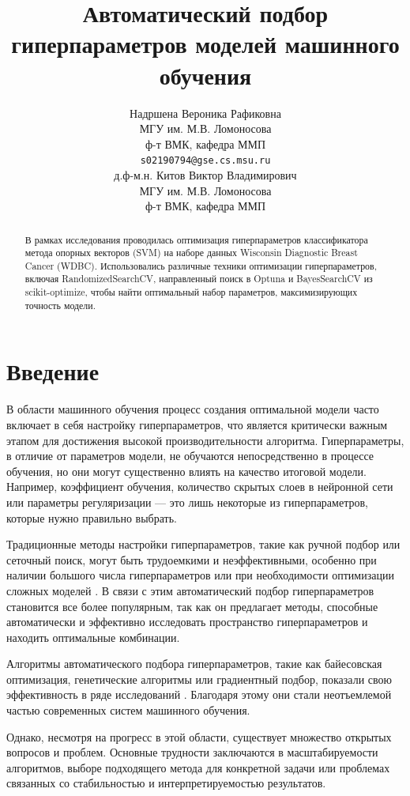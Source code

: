 \documentclass{article}
\title{Автоматический подбор гиперпараметров моделей машинного обучения}
\author{ Надршена Вероника Рафиковна  \\
	МГУ им. М.В. Ломоносова\\
	ф-т ВМК, кафедра ММП\\
	\texttt{s02190794@gse.cs.msu.ru} \\
	\And
	д.ф-м.н. Китов Виктор Владимирович\\
	МГУ им. М.В. Ломоносова\\
	ф-т ВМК, кафедра ММП\\
}
\date{}
\begin{document}
\nocite{*}
\maketitle

\begin{abstract}
В рамках исследования проводилась оптимизация гиперпараметров классификатора метода опорных векторов (SVM) на наборе данных Wisconsin Diagnostic Breast Cancer (WDBC). Использовались различные техники оптимизации гиперпараметров, включая RandomizedSearchCV, направленный поиск в Optuna и BayesSearchCV из scikit-optimize, чтобы найти оптимальный набор параметров, максимизирующих точность модели.

\end{abstract}



\section{Введение}
В области машинного обучения процесс создания оптимальной модели часто включает в себя настройку гиперпараметров, что является критически важным этапом для достижения высокой производительности алгоритма. Гиперпараметры, в отличие от параметров модели, не обучаются непосредственно в процессе обучения, но они могут существенно влиять на качество итоговой модели. Например, коэффициент обучения, количество скрытых слоев в нейронной сети или параметры регуляризации — это лишь некоторые из гиперпараметров, которые нужно правильно выбрать.

Традиционные методы настройки гиперпараметров, такие как ручной подбор или сеточный поиск, могут быть трудоемкими и неэффективными, особенно при наличии большого числа гиперпараметров или при необходимости оптимизации сложных моделей \citep{bergstra2012}. В связи с этим автоматический подбор гиперпараметров становится все более популярным, так как он предлагает методы, способные автоматически и эффективно исследовать пространство гиперпараметров и находить оптимальные комбинации.

Алгоритмы автоматического подбора гиперпараметров, такие как байесовская оптимизация, генетические алгоритмы или градиентный подбор, показали свою эффективность в ряде исследований \citep{snoek2012, thornton2013}. Благодаря этому они стали неотъемлемой частью современных систем машинного обучения.

Однако, несмотря на прогресс в этой области, существует множество открытых вопросов и проблем. Основные трудности заключаются в масштабируемости алгоритмов, выборе подходящего метода для конкретной задачи или проблемах связанных со стабильностью и интерпретируемостью результатов.
\end{document}
